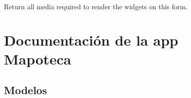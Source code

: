 \documentclass[letterpaper,10pt,spanish]{sphinxmanual}
\begin{document}
\begin{fulllineitems}
\begin{fulllineitems}

\pysigstartsignatures
{}
\pysigstopsignatures
\end{fulllineitems}



\begin{fulllineitems}

\pysigstartsignatures
{}
\pysigstopsignatures
\sphinxAtStartPar
Return all media required to render the widgets on this form.

\end{fulllineitems}


\end{fulllineitems}


\sphinxstepscope


\chapter{Documentación de la app Mapoteca}
\label{\detokenize{mapoteca:documentacion-de-la-app-mapoteca}}\label{\detokenize{mapoteca::doc}}

\section{Modelos}
\label{\detokenize{mapoteca:modelos}}
\end{document}
